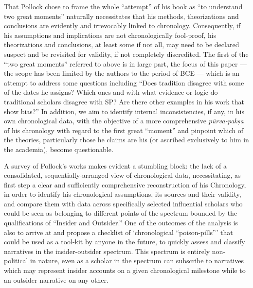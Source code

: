 That Pollock chose to frame the whole “attempt” of his book as “to understand two great moments” naturally necessitates that his methods, theorizations and conclusions are evidently and irrevocably linked to chronology. Consequently, if his assumptions and implications are not chronologically fool-proof, his theorizations and conclusions, at least some if not all, may need to be declared suspect and be revisited for validity, if not completely discredited. The first of the “two great moments” referred to above is in large part, the focus of this paper — the scope has been limited by the authors to the period of BCE — which is an attempt to address some questions including “Does tradition disagree with some of the dates he assigns? Which ones and with what evidence or logic do traditional scholars disagree with SP? Are there other examples in his work that show bias?” In addition, we aim to identify internal inconsistencies, if any, in his own chronological data, with the objective of a more comprehensive \textit{pūrva-pakṣa} of his chronology with regard to the first great “moment” and pinpoint which of the theories, particularly those he claims are his (or ascribed exclusively to him in the academia), become questionable.

\bigskip

A survey of Pollock’s works makes evident a stumbling block: the lack of a consolidated, sequentially-arranged view of chronological data, necessitating, as first step a clear and sufficiently comprehensive reconstruction of his Chronology, in order to identify his chronological assumptions, its sources and their validity, and compare them with data across specifically selected influential scholars who could be seen as belonging to different points of the spectrum bounded by the qualifications of “Insider and Outsider.” One of the outcomes of the analysis is also to arrive at and propose a checklist of ‘chronological “poison-pills”’ that could be used as a tool-kit by anyone in the future, to quickly assess and classify narratives in the insider-outsider spectrum. This spectrum is entirely non-political in nature, even as a scholar in the spectrum can subscribe to narratives which may represent insider accounts on a given chronological milestone while to an outsider narrative on any other.

